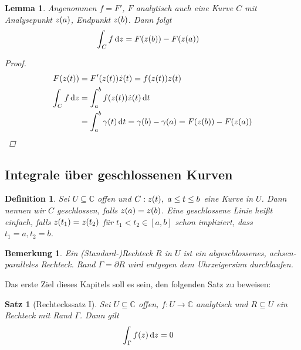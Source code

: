 \documentclass[11pt, a4paper]{article}
\theoremstyle{plain}
\newtheorem{bemerkung}[blockelement]{Bemerkung}
\newtheorem{definition}[blockelement]{Definition}
\newtheorem{lemma}[blockelement]{Lemma}
\newtheorem{satz}[blockelement]{Satz}
\numberwithin{equation}{subsection}
\newcommand{\of}[1]{\mathopen{}\mathclose{}\bgroup\left(#1\aftergroup\egroup\right)}
\newcommand{\interv}[1]{\left[#1\right]}
\newcommand{\dif}{\mathop{}\!\mathrm{d}}
\newcommand{\C}{\mathbb{C}}
\begin{document}
    \begin{lemma}
        \label{lemma:stammfunktion-kurvint}
        Angenommen $f = F'$, $F$ analytisch auch eine Kurve $C$ mit Analysepunkt $z\of{a}$, Endpunkt $z\of{b}$. Dann folgt
        \begin{align*}
            \int_{C}^{} f \dif z &= F\of{z\of{b}} - F\of{z\of{a}}
        \end{align*}

        \begin{proof}
            \begin{align*}
                F\of{z\of{t}} &= F'\of{z\of{t}}\dot z\of{t} = f\of{z\of{t}}z\of{t}\\
                \int_{C}^{} f \dif z &= \int_{a}^{b} f\of{z\of{t}}\dot z\of{t} \dif t\\
                &= \int_{a}^{b} \gamma\of{t}  \dif t = \gamma\of{b} - \gamma\of{a} = F\of{z\of{b}} - F\of{z\of{a}}\qedhere
            \end{align*}
        \end{proof}
    \end{lemma}

    \subsection{Integrale über geschlossenen Kurven}

    \begin{definition}
        \marginnote{[06. Mai]}
        Sei $U\subseteq\C$ offen und $C: z\of{t},~a\leq t\leq b$ eine Kurve in $U$. Dann nennen wir $C$ geschlossen, falls $z\of{a} = z\of{b}$. Eine geschlossene Linie heißt einfach, falls $z\of{t_1} = z\of{t_2}$ für $t_1 < t_2 \in\interv{a,b}$ schon impliziert, dass $t_1 = a, t_2 = b$.
    \end{definition}

    \begin{bemerkung}
        Ein (Standard-)Rechteck $R$ in $U$ ist ein abgeschlossenes, achsen-paralleles Rechteck. Rand $\Gamma = \partial R$ wird entgegen dem Uhrzeigersinn durchlaufen.
    \end{bemerkung}

    Das erste Ziel dieses Kapitels soll es sein, den folgenden Satz zu beweisen:

    \begin{satz}[Rechteckssatz I] %
        \label{satz:rechtecksatz-1}
        Sei $U\subseteq\C$ offen, $f: U\to\C$ analytisch und $R\subseteq U$ ein Rechteck mit Rand $\Gamma$. Dann gilt
        \begin{align*}
            \int_{\Gamma}^{} f\of{z} \dif z &= 0
        \end{align*}
    \end{satz}
\end{document}
